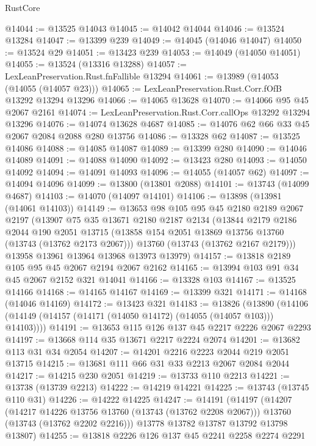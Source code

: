 \begin{lexlean}{RustCore}
\begin{coremodule}
@14044 := @13525 @14043
@14045 := @14042 @14044
@14046 := @13524 @13284
@14047 := @13399 @239
@14049 := @14045 (@14046 @14047)
@14050 := @13524 @29
@14051 := @13423 @239
@14053 := @14049 (@14050 @14051)
@14055 := @13524 (@13316 @13288)
@14057 := LexLeanPreservation.Rust.fnFallible @13294
@14061 := @13989 (@14053 (@14055 (@14057 @23)))
@14065 := LexLeanPreservation.Rust.Corr.fOfB @13292 @13294 @13296
@14066 := @14065 @13628
@14070 := @14066 @95 @45 @2067 @2161
@14074 := LexLeanPreservation.Rust.Corr.callOps @13292 @13294 @13296
@14076 := @14074 @13628 @4687
@14085 := @14076 @62 @66 @33 @45 @2067 @2084 @2088 @280 @13756
@14086 := @13328 @62
@14087 := @13525 @14086
@14088 := @14085 @14087
@14089 := @13399 @280
@14090 := @14046 @14089
@14091 := @14088 @14090
@14092 := @13423 @280
@14093 := @14050 @14092
@14094 := @14091 @14093
@14096 := @14055 (@14057 @62)
@14097 := @14094 @14096
@14099 := @13800 (@13801 @2088)
@14101 := @13743 (@14099 @4687)
@14103 := @14070 (@14097 @14101)
@14106 := @13898 (@13981 (@14061 @14103))
@14149 := @13653
    @98
    @105
    @95
    @45
    @2180
    @2189
    @2067
    @2197
    (@13907
      @75
      @35
      @13671
      @2180
      @2187
      @2134
      (@13844
        @2179
        @2186
        @2044
        @190
        @2051
        @13715
        (@13858 @154 @2051 @13869 @13756 @13760 (@13743 (@13762 @2173 @2067)))
        @13760
        (@13743 (@13762 @2167 @2179)))
      @13958
      @13961
      @13964
      @13968
      @13973
      @13979)
@14157 := @13818 @2189 @105 @95 @45 @2067 @2194 @2067 @2162
@14165 := @13994 @103 @91 @34 @45 @2067 @2152 @321 @14041
@14166 := @13328 @103
@14167 := @13525 @14166
@14168 := @14165 @14167
@14169 := @13399 @321
@14171 := @14168 (@14046 @14169)
@14172 := @13423 @321
@14183 := @13826
    (@13890 (@14106 (@14149 (@14157 (@14171 (@14050 @14172) (@14055 (@14057 @103))) @14103))))
@14191 := @13653 @115 @126 @137 @45 @2217 @2226 @2067 @2293
@14197 := @13668 @114 @35 @13671 @2217 @2224 @2074
@14201 := @13682 @113 @31 @34 @2054
@14207 := @14201 @2216 @2223 @2044 @219 @2051 @13715
@14215 := @13681 @111 @66 @31 @33 @2213 @2067 @2084 @2044
@14217 := @14215 @230 @2051
@14219 := @13733 @110 @2213
@14221 := @13738 (@13739 @2213)
@14222 := @14219 @14221
@14225 := @13743 (@13745 @110 @31)
@14226 := @14222 @14225
@14247 := @14191
    (@14197
      (@14207
        (@14217 @14226 @13756 @13760 (@13743 (@13762 @2208 @2067)))
        @13760
        (@13743 (@13762 @2202 @2216)))
      @13778
      @13782
      @13787
      @13792
      @13798
      @13807)
@14255 := @13818 @2226 @126 @137 @45 @2241 @2258 @2274 @2291

\end{coremodule}
\end{lexlean}
